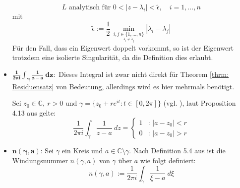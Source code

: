 \documentclass[a4paper,12pt]{report}
\newcommand{\C}{\mathbb C}
\newcommand{\1}{\mathds{1}}
\theoremstyle{plain} %
\theoremstyle{definition} %
\theoremstyle{remark}
\begin{document}
\begin{itemize}
                        \begin{equation}
                              \label{hilfe: complexAnalysis_isolierteSingularitäten}
                              L \text{ analytisch für } 0<|z-\lambda_i|<\widetilde{\epsilon},\quad i=1,\dots,n
                        \end{equation}
                        mit
                        $$\widetilde{\epsilon}:= \frac{1}{2}\,\min_{\underset{\lambda_i\ne \lambda_j}{i,j\in \{1,\dots,n\}} } |\lambda_i-\lambda_j|$$
                        Für den Fall, dass ein Eigenwert doppelt vorkommt, so ist der Eigenwert trotzdem eine isolierte Singularität, da die Definition dies erlaubt.
                  \item $\mathbf{\frac{1}{2\pi i}\int_{\gamma} \frac 1 {z-a}\ dz:}$
                        Dieses Integral ist zwar nicht direkt für Theorem \ref{thrm: Residuensatz} von Bedeutung, allerdings wird es hier mehrmals benötigt.

                        Sei $z_0\in\C,\ r>0\text{ und }\gamma=\{z_0+r e^{it}: t\in [0,2\pi]\}$ (vgl. \cite[S. 48]{complexAnalysis}), laut Proposition 4.13 aus \cite[S. 48]{complexAnalysis} gelte:
                        \begin{equation}
                              \label{hilfe: complexAnalysis_IntegralEinsDurchX}
                              \frac{1}{2\pi i}\int_\gamma \frac 1 {z-a}\ dz = \begin{cases}
                                    1 & \text{: } |a-z_0|<r \\
                                    0 & \text{: } |a-z_0|>r
                                    \end{cases}
                        \end{equation}
                  \item $\mathbf{n(\gamma, a)}$:
                        Sei $\gamma$ ein Kreis und $a\in \C\setminus \gamma$.
                        Nach Definition 5.4 aus \cite[S. 65]{complexAnalysis} ist die Windungsnummer $n(\gamma,a)$ von $\gamma$ über $a$ wie folgt definiert:
                        $$n(\gamma,a):= \frac{1}{2\pi i}\int_\gamma \frac{1}{\xi-a}\ d\xi$$


\end{itemize}
\end{document}
